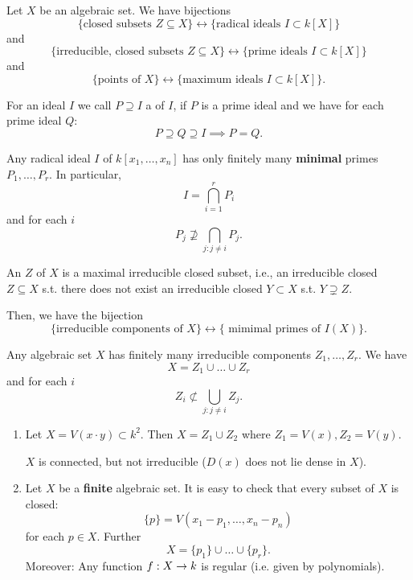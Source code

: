 \begin{lemma}
	Let $X$ be an algebraic set. We have bijections
	\[
	\{ \text{closed subsets } Z \subseteq X\} \leftrightarrow \{ \text{radical ideals } I \subset k[X]\}
	\]
	and
	\[
	\{ \text{irreducible, closed subsets } Z \subseteq X\} \leftrightarrow \{ \text{prime ideals } I \subset k[X]\}
	\]
		and
	\[
	\{ \text{points of } X\} \leftrightarrow \{ \text{maximum ideals } I \subset k[X]\}.
	\]
\end{lemma}
\begin{lemma}
For an ideal $I$ we call $P \supseteq I$ a  of $I$, if $P$ is a prime ideal and we have for each prime ideal $Q$:
\[ P \supseteq Q \supseteq I \implies P = Q. \]

Any radical ideal $I $ of $k[x_1, \ldots, x_n]$ has only finitely many \textbf{minimal} primes $P_1,\ldots, P_r$.
In particular,
\[ I = \bigcap_{i=1}^r P_i \]
and for each $i$
\[ P_j \not \supseteq \bigcap_{j : j \neq i} P_j. \]
\end{lemma}

\begin{definition}
An  $Z$ of $X$ is a maximal irreducible closed subset, i.e., an irreducible closed $Z \subseteq X$ s.t. there does not exist an irreducible closed $Y \subset X$ s.t. $Y \supsetneq Z$.

Then, we have the bijection
	\[
\{ \text{irreducible components of } X\} \leftrightarrow \{ \text{ mimimal primes of } I(X)\}.
\]
\end{definition}

\begin{lemma}
Any algebraic set $X$ has finitely many irreducible components $Z_1, \ldots, Z_r$. We have
\[ X = Z_1 \cup \ldots \cup Z_r \]
and for each $i$
\[ Z_i \not \subset \bigcup_{j : j \neq i}Z_j. \]
\end{lemma}

\begin{example}
	\begin{enumerate}
		\item 	Let $X = V(x\cdot y) \subset k^2$. Then $X = Z_1\cup Z_2$ where $Z_1 = V(x), Z_2 = V(y)$.
		
		$X$ is connected, but not irreducible ($D(x)$ does not lie dense in $X$).
		\item Let $X$ be a \textbf{finite} algebraic set. It is easy to check that every subset of $X$ is closed:
		\[ \{p\} = V(x_1-p_1, \ldots, x_n-p_n) \]
		for each $p \in X$. Further
		\[ X = \{p_1\}\cup \ldots \cup \{p_r\}. \]
		Moreover: Any function $f : X \overset{}{\rightarrow} k$ is regular (i.e. given by polynomials).
	\end{enumerate}
\end{example}

